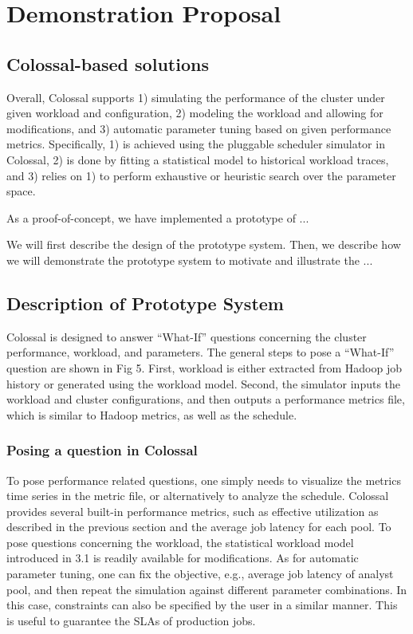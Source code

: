 \clearpage
\section{Demonstration Proposal}

\subsection{Colossal-based solutions}
Overall, Colossal supports 1) simulating the performance of the
cluster under given workload and configuration, 2) modeling the
workload and allowing for modifications, and 3) automatic parameter
tuning based on given performance metrics. Specifically, 1) is
achieved using the pluggable scheduler simulator in Colossal, 2) is
done by fitting a statistical model to historical workload traces,
and 3) relies on 1) to perform exhaustive or heuristic search over
the parameter space.

As a proof-of-concept, we have implemented a prototype of ...

We will first describe the design of the prototype system.
Then, we describe how we will demonstrate the 
prototype system to motivate and illustrate the ...

\vspace{-1mm}
\subsection{Description of Prototype System}


Colossal is designed to answer ``What-If'' questions concerning the
cluster performance, workload, and parameters. The general steps to
pose a ``What-If'' question are shown in Fig 5. First, workload is
either extracted from Hadoop job history or generated using the
workload model. Second, the simulator inputs the workload and
cluster configurations, and then outputs a performance metrics
file, which is similar to Hadoop metrics, as well as the schedule.

\subsubsection{Posing a question in Colossal}
To pose performance related questions, one simply needs to
visualize the metrics time series in the metric file, or
alternatively to analyze the schedule. Colossal provides several
built-in performance metrics, such as effective utilization as
described in the previous section and the average job latency for
each pool. To pose questions concerning the workload, the
statistical workload model introduced in 3.1 is readily available
for modifications. As for automatic parameter tuning, one can fix
the objective, e.g., average job latency of analyst pool, and then
repeat the simulation against different parameter combinations. In
this case, constraints can also be specified by the user in a
similar manner. This is useful to guarantee the SLAs of production
jobs.




